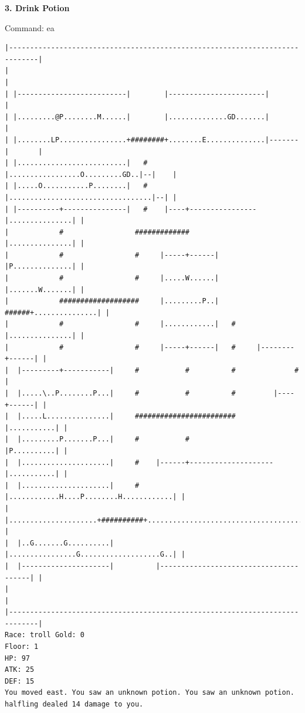 \documentclass[11pt]{article}
\theoremstyle{plain}
\begin{document}
\newpage
\textbf{3. Drink Potion}

Command: ea
\begin{Verbatim}[fontsize=\scriptsize]
|-----------------------------------------------------------------------------|
|                                                                             |
| |--------------------------|        |-----------------------|               |
| |.........@P........M......|        |..............GD.......|               |
| |........LP................+########+........E..............|-------|       |
| |..........................|   #    |.................O.........GD..|--|    |
| |.....O...........P........|   #    |..................................|--| |
| |----------+---------------|   #    |----+----------------|...............| |
|            #                 #############                |...............| |
|            #                 #     |-----+------|         |P..............| |
|            #                 #     |.....W......|         |.......W.......| |
|            ###################     |.........P..|   ######+...............| |
|            #                 #     |............|   #     |...............| |
|            #                 #     |-----+------|   #     |--------+------| |
|  |---------+-----------|     #           #          #              #        |
|  |.....\..P........P...|     #           #          #         |----+------| |
|  |.....L...............|     ########################         |...........| |
|  |.........P.......P...|     #           #                    |P..........| |
|  |.....................|     #    |------+--------------------|...........| |
|  |.....................|     #    |............H....P........H............| |
|  |.....................+##########+.......................................| |
|  |..G.......G..........|          |................G...................G..| |
|  |---------------------|          |---------------------------------------| |
|                                                                             |
|-----------------------------------------------------------------------------|
Race: troll Gold: 0                                                    Floor: 1
HP: 97
ATK: 25
DEF: 15
You moved east. You saw an unknown potion. You saw an unknown potion. halfling dealed 14 damage to you. 
\end{Verbatim}
\end{document}
